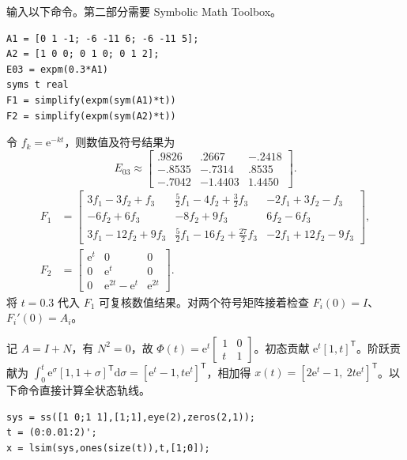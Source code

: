 
\sol 输入以下命令。第二部分需要 Symbolic Math Toolbox。
\begin{verbatim}
A1 = [0 1 -1; -6 -11 6; -6 -11 5];
A2 = [1 0 0; 0 1 0; 0 1 2];
E03 = expm(0.3*A1)
syms t real
F1 = simplify(expm(sym(A1)*t))
F2 = simplify(expm(sym(A2)*t))
\end{verbatim}
令 $f_k=\mathrm e^{-kt}$，则数值及符号结果为
\[
E_{03}\approx
\begin{bmatrix}.9826&.2667&-.2418\\-.8535&-.7314&.8535\\-.7042&-1.4403&1.4450\end{bmatrix}.
\]
\[
\begin{aligned}
F_1&=\begin{bmatrix}
3f_1-3f_2+f_3&\frac52 f_1-4f_2+\frac32 f_3&-2f_1+3f_2-f_3\\
-6f_2+6f_3&-8f_2+9f_3&6f_2-6f_3\\
3f_1-12f_2+9f_3&\frac52 f_1-16f_2+\frac{27}2 f_3&-2f_1+12f_2-9f_3
\end{bmatrix},\\
F_2&=\begin{bmatrix}\mathrm e^t&0&0\\0&\mathrm e^t&0\\0&\mathrm e^{2t}-\mathrm e^t&\mathrm e^{2t}\end{bmatrix}.
\end{aligned}
\]
将 $t=0.3$ 代入 $F_1$ 可复核数值结果。对两个符号矩阵接着检查 $F_i(0)=I$、$F_i'(0)=A_i$。



\sol 记 $A=I+N$，有 $N^2=0$，故 $\Phi(t)=\mathrm e^t\begin{bmatrix}1&0\\ t&1\end{bmatrix}$。初态贡献 $\mathrm e^t[1,t]^{\mathsf T}$。阶跃贡献为 $\int_0^t\mathrm e^\sigma[1,1+\sigma]^{\mathsf T}\mathrm d\sigma=[\mathrm e^t-1,t\mathrm e^t]^{\mathsf T}$，相加得 $x(t)=[2\mathrm e^t-1,\ 2t\mathrm e^t]^{\mathsf T}$。以下命令直接计算全状态轨线。
\begin{verbatim}
sys = ss([1 0;1 1],[1;1],eye(2),zeros(2,1));
t = (0:0.01:2)';
x = lsim(sys,ones(size(t)),t,[1;0]);
\end{verbatim}

